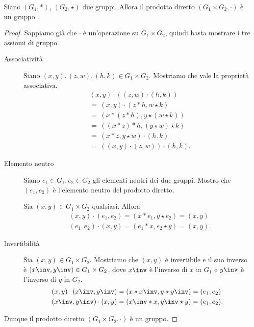 \begin{proposition}
    Siano $(G_1, *)$, $(G_2, \star)$ due gruppi. Allora il prodotto diretto $(G_1 \times G_2, \cdot)$ è un gruppo. 
\end{proposition}
\begin{proof}
    Sappiamo già che $\cdot$ è un'operazione su $G_1 \times G_2$, quindi basta mostrare i tre assiomi di gruppo.
    \begin{description}
        \item[Associatività] Siano $(x, y), (z, w), (h, k) \in G_1 \times G_2$. Mostriamo che vale la proprietà associativa.
        \begin{align*}
            &(x, y) \cdot ((z, w) \cdot (h, k)) \tag{def. di $\cdot$}\\
            &=\ (x, y) \cdot (z * h, w \star k)\tag{def. di $\cdot$}\\
            &=\ (x * (z * h), y \star (w \star k))\tag{ass. di $*$ e $\star$}\\
            &=\ ((x * z) * h, (y \star w) \star k) \\
            &=\ (x * z, y \star w) \cdot (h, k) \\
            &=\ ((x, y) \cdot (z, w)) \cdot (h, k).
        \end{align*}  
        \item[Elemento neutro] Siano $e_1 \in G_1, e_2 \in G_2$ gli elementi neutri dei due gruppi. Mostro che $(e_1, e_2)$ è l'elemento neutro del prodotto diretto.
        
        Sia $(x, y) \in G_1 \times G_2$ qualsiasi. Allora \begin{align*}
            &(x, y) \cdot (e_1, e_2) = (x * e_1, y \star e_2) = (x, y)\\
            &(e_1, e_2)\cdot (x, y)  = (e_1 * x, e_2 \star y) = (x, y).
        \end{align*}
        \item[Invertibilità] Sia $(x, y) \in G_1 \times G_2$. Mostriamo che $(x, y)$ è invertibile e il suo inverso è $(x\inv, y\inv) \in G_1 \times G_2$, dove $x\inv$ è l'inverso di $x$ in $G_1$ e $y\inv$ è l'inverso di $y$ in $G_2$.
        \begin{align*}
            &(x, y) \cdot (x\inv, y\inv) = (x * x\inv, y \star y\inv) = (e_1, e_2)\\
            &(x\inv, y\inv)\cdot (x, y)  = (x\inv * x, y\inv \star y) = (e_1, e_2).
        \end{align*} 
    \end{description}
    Dunque il prodotto diretto $(G_1 \times G_2, \cdot)$ è un gruppo.
\end{proof}


